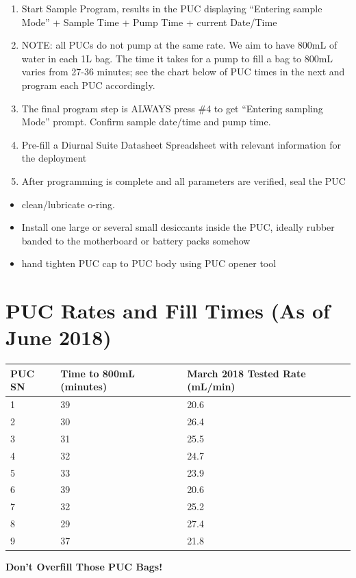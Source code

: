 \documentclass[]{book}
\providecommand{\tightlist}{%
  \setlength{\itemsep}{0pt}\setlength{\parskip}{0pt}}
\begin{document}
\begin{enumerate}
\def\labelenumi{\arabic{enumi}.}
\setcounter{enumi}{6}
\item
  Start Sample Program, results in the PUC displaying ``Entering sample Mode'' + Sample Time + Pump Time + current Date/Time
\item
  NOTE: all PUCs do not pump at the same rate. We aim to have 800mL of water in each 1L bag. The time it takes for a pump to fill a bag to 800mL varies from 27-36 minutes; see the chart below of PUC times in the next and program each PUC accordingly.
\item
  The final program step is ALWAYS press \#4 to get ``Entering sampling Mode'' prompt. Confirm sample date/time and pump time.
\item
  Pre-fill a Diurnal Suite Datasheet Spreadsheet with relevant information for the deployment
\item
  After programming is complete and all parameters are verified, seal the PUC
\end{enumerate}

\begin{itemize}
\tightlist
\item
  clean/lubricate o-ring.
\item
  Install one large or several small desiccants inside the PUC, ideally rubber banded to the motherboard or battery packs somehow
\item
  hand tighten PUC cap to PUC body using PUC opener tool
\end{itemize}

\hypertarget{puc-rates-and-fill-times-as-of-june-2018}{%
\section{PUC Rates and Fill Times (As of June 2018)}\label{puc-rates-and-fill-times-as-of-june-2018}}

\begin{longtable}[]{@{}lll@{}}
\toprule
\textbf{PUC SN} & \textbf{Time to 800mL (minutes)} & \textbf{March 2018 Tested Rate (mL/min)}\tabularnewline
\midrule
\endhead
1 & 39 & 20.6\tabularnewline
2 & 30 & 26.4\tabularnewline
3 & 31 & 25.5\tabularnewline
4 & 32 & 24.7\tabularnewline
5 & 33 & 23.9\tabularnewline
6 & 39 & 20.6\tabularnewline
7 & 32 & 25.2\tabularnewline
8 & 29 & 27.4\tabularnewline
9 & 37 & 21.8\tabularnewline
\bottomrule
\end{longtable}

\textbf{Don't Overfill Those PUC Bags!}
\end{document}
